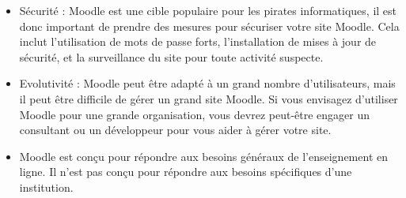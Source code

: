 \begin{enumerate}[label=\alph*]
\begin{itemize}
            \item Sécurité : Moodle est une cible populaire pour les pirates informatiques, il est donc important de prendre des mesures pour sécuriser votre site Moodle. Cela inclut l'utilisation de mots de passe forts, l'installation de mises à jour de sécurité, et la surveillance du site pour toute activité suspecte.
            \item Evolutivité : Moodle peut être adapté à un grand nombre d'utilisateurs, mais il peut être difficile de gérer un grand site Moodle. Si vous envisagez d'utiliser Moodle pour une grande organisation, vous devrez peut-être engager un consultant ou un développeur pour vous aider à gérer votre site.
            \item Moodle est conçu pour répondre aux besoins généraux de l'enseignement en ligne. Il n'est pas conçu pour répondre aux besoins spécifiques d'une institution.
        \end{itemize}
\end{enumerate}
